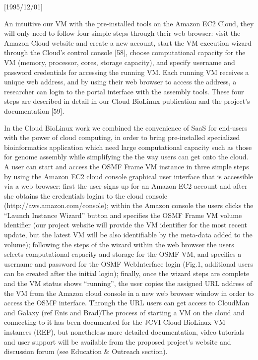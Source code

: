 \NeedsTeXFormat{LaTeX2e}[1995/12/01] \documentclass[10pt]{bmc_article}
\newenvironment{bmcformat}{\begin{raggedright}\baselineskip20pt\sloppy\setboolean{publ}{false}}{\end{raggedright}\baselineskip20pt\sloppy}
\begin{document}
\begin{bmcformat}
An intuitive \cite{youtube}
our VM with the pre-installed tools on the Amazon EC2 Cloud, they will only need to follow four simple steps
through their web browser: visit the Amazon Cloud website and create a new account, start the VM execution
wizard through the Cloud's control console [58], choose computational capacity for the VM (memory,
processor, cores, storage capacity), and specify username and password credentials for accessing the running
VM. Each running VM receives a unique web address, and by using their web browser to access the address, a
researcher can login to the portal interface with the assembly tools. These four steps are described in detail
in our Cloud BioLinux publication and the project's documentation [59].

In the Cloud BioLinux work we combined the convenience of SaaS for end-users with the power of cloud computing, 
in order to bring pre-installed specialized bioinformatics application which need large computational capacity 
such as those for genome assembly while simplifying the the way users can get onto the cloud.
A user can start and access the OSMF Frame VM instance in three simple steps by using the Amazon EC2 cloud console 
graphical user interface that is accessible via a web browser: first the user signs up for an Amazon EC2 account and 
after she obtains the credentials logins to the cloud console (http://aws.amazon.com/console);  within the Amazon 
console the users clicks the “Launch Instance Wizard” button and specifies the OSMF Frame VM volume identifier 
(our project website will provide the VM identifier for the most recent update, but the latest VM will be also identifiable 
by the meta-data added to the volume); following the steps of the wizard within the web browser the users selects 
computational capacity and storage for the OSMF VM, and specifies a username and password for the OSMF 
WebInterface login (Fig.1, additional users can be created after the initial login); finally, once the wizard steps are 
complete and the VM status shows “running”, the user copies the assigned URL address of the VM from the Amazon 
cloud console in a new web browser window in order to access the OSMF interface. Through the URL users can get access
to CloudMan and Galaxy (ref Enis and Brad)The process of starting a VM on 
the cloud and connecting to it has been documented for the JCVI Cloud BioLinux VM instances (REF), but nonetheless 
more detailed documentation, video tutorials and user support will be available from the proposed project's website 
and discussion forum (see Education & Outreach section).




\end{bmcformat}
\end{document}
